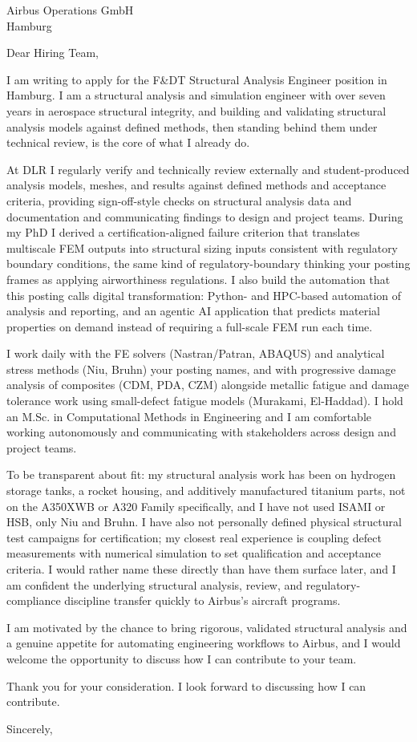\documentclass[10pt]{letter}
\begin{document}
\begin{letter}{Airbus Operations GmbH \\ Hamburg}
\opening{Dear Hiring Team,}

I am writing to apply for the F\&DT Structural Analysis Engineer position in Hamburg. I am a structural analysis and simulation engineer with over seven years in aerospace structural integrity, and building and validating structural analysis models against defined methods, then standing behind them under technical review, is the core of what I already do.

At DLR I regularly verify and technically review externally and student-produced analysis models, meshes, and results against defined methods and acceptance criteria, providing sign-off-style checks on structural analysis data and documentation and communicating findings to design and project teams. During my PhD I derived a certification-aligned failure criterion that translates multiscale FEM outputs into structural sizing inputs consistent with regulatory boundary conditions, the same kind of regulatory-boundary thinking your posting frames as applying airworthiness regulations. I also build the automation that this posting calls digital transformation: Python- and HPC-based automation of analysis and reporting, and an agentic AI application that predicts material properties on demand instead of requiring a full-scale FEM run each time.

I work daily with the FE solvers (Nastran/Patran, ABAQUS) and analytical stress methods (Niu, Bruhn) your posting names, and with progressive damage analysis of composites (CDM, PDA, CZM) alongside metallic fatigue and damage tolerance work using small-defect fatigue models (Murakami, El-Haddad). I hold an M.Sc. in Computational Methods in Engineering and I am comfortable working autonomously and communicating with stakeholders across design and project teams.

To be transparent about fit: my structural analysis work has been on hydrogen storage tanks, a rocket housing, and additively manufactured titanium parts, not on the A350XWB or A320 Family specifically, and I have not used ISAMI or HSB, only Niu and Bruhn. I have also not personally defined physical structural test campaigns for certification; my closest real experience is coupling defect measurements with numerical simulation to set qualification and acceptance criteria. I would rather name these directly than have them surface later, and I am confident the underlying structural analysis, review, and regulatory-compliance discipline transfer quickly to Airbus's aircraft programs.

I am motivated by the chance to bring rigorous, validated structural analysis and a genuine appetite for automating engineering workflows to Airbus, and I would welcome the opportunity to discuss how I can contribute to your team.

Thank you for your consideration. I look forward to discussing how I can contribute.

\closing{Sincerely,}
\end{letter}
\end{document}
